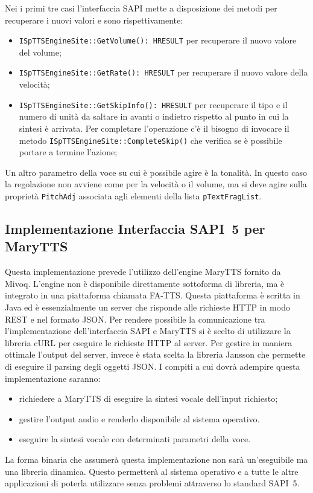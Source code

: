 	Nei i primi tre casi l'interfaccia SAPI mette a disposizione dei metodi per recuperare i nuovi valori e sono rispettivamente:
	\begin{itemize}
		\item \texttt{ISpTTSEngineSite::GetVolume(): HRESULT} per recuperare il nuovo valore del volume;
		\item \texttt{ISpTTSEngineSite::GetRate(): HRESULT} per recuperare il nuovo valore della velocità;
		\item \texttt{ISpTTSEngineSite::GetSkipInfo(): HRESULT} per recuperare il tipo e il numero di unità da saltare in avanti o indietro rispetto al punto in cui la sintesi è arrivata. Per completare l'operazione c'è il bisogno di invocare il metodo \texttt{ISpTTSEngineSite::CompleteSkip()} che verifica se è possibile portare a termine l'azione;
	\end{itemize}	
	Un altro parametro della voce su cui è possibile agire è la tonalità. In questo caso la regolazione non avviene come per la velocità o il volume, ma si deve agire sulla proprietà \texttt{PitchAdj} associata agli elementi della lista \texttt{pTextFragList}.
	\subsection{Implementazione Interfaccia SAPI~5 per MaryTTS}
	Questa implementazione prevede l'utilizzo dell'engine MaryTTS fornito da Mivoq. L'engine non è disponibile direttamente sottoforma di libreria, ma è integrato in una piattaforma chiamata FA-TTS. Questa piattaforma è scritta in Java ed è essenzialmente un server che risponde alle richieste HTTP in modo REST e nel formato JSON.
	Per rendere possibile la comunicazione tra l'implementazione dell'interfaccia SAPI e MaryTTS si è scelto di utilizzare la libreria cURL per eseguire le richieste HTTP al server.
	Per gestire in maniera ottimale l'output del server, invece è stata scelta la libreria Jansson che permette di eseguire il parsing degli oggetti JSON.
	I compiti a cui dovrà adempire questa implementazione saranno:
	\begin{itemize}
		\item richiedere a MaryTTS di eseguire la sintesi vocale dell'input richiesto;
		\item gestire l'output audio e renderlo disponibile al sistema operativo.
		\item eseguire la sintesi vocale con determinati parametri della voce.
	\end{itemize}
	La forma binaria che assumerà questa implementazione non sarà un'eseguibile ma una libreria dinamica. Questo permetterà al sistema operativo e a tutte le altre applicazioni di poterla utilizzare senza problemi attraverso lo standard SAPI~5.
